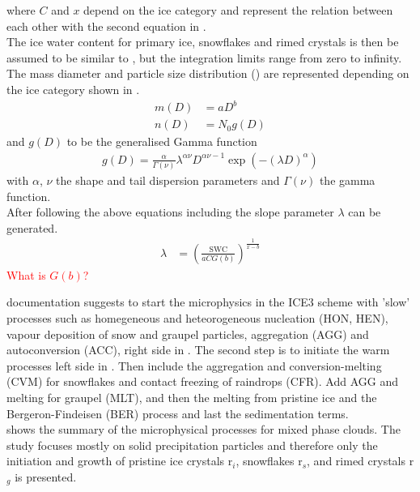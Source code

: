 where $C$ and $x$ depend on the ice category and represent the relation between each other with the second equation in . 
\\
The ice water content for primary ice, snowflakes and rimed crystals is then be assumed to be similar to , but the integration limits range from zero to infinity. The mass diameter and particle size distribution () are represented depending on the ice category shown in .
\begin{align}
	m(D) & = aD^b 	\label{eq:mass_diameter} \\
	n(D) & = N_0 g(D)	\label{eq:PSD_MEPS}
\end{align}
and $g(D)$ to be the generalised Gamma function 
\begin{align}
	g(D) = \frac{\alpha}{\Gamma(\nu)} \lambda^{\alpha \nu} D^{\alpha \nu -1} \exp\left( -(\lambda D)^\alpha \right)
\end{align}
with $\alpha$, $\nu$ the shape and tail dispersion parameters and $\Gamma(\nu)$ the gamma function. 
\\
After following the above equations including  the slope parameter $\lambda$ can be generated.
\begin{align}
	\lambda & = \left( \frac{\text{SWC}}{aCG(b)}\right)^{\frac{1}{x-b}}
\end{align}
\textcolor{red}{What is $G(b)$?}
%

\newline
\cite{meteo_france_meso-nh_2009} documentation suggests to start the microphysics in the ICE3 scheme with 'slow' processes such as homegeneous and heteorogeneous nucleation (HON, HEN), vapour deposition of snow and graupel particles, aggregation (AGG) and autoconversion (ACC), right side in . The second step is to initiate the warm processes left side in . Then include the aggregation and conversion-melting (CVM) for snowflakes and contact freezing of raindrops (CFR). Add AGG and melting for graupel (MLT), and then the melting from pristine ice  and the Bergeron-Findeisen (BER) process and last the sedimentation terms.  \\
 shows the summary of the microphysical processes for mixed phase clouds. The study focuses mostly on solid precipitation particles and therefore only the initiation and growth of pristine ice crystals r$_i$, snowflakes r$_s$, and rimed crystals r$_g$ is presented. 
